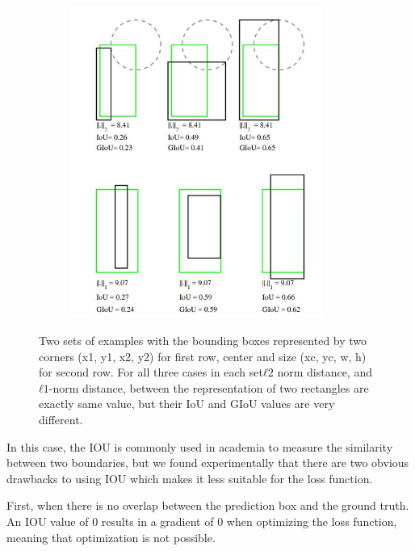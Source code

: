 \begin{figure}[h]
	\begin{center}
		\begin{subfigure}[b]{0.49\textwidth}
		    \centering
			\includegraphics[width=0.9\textwidth]{thesis-template-master/images/l2loss.JPG}
			\label{fig:cellnet}
		\end{subfigure}
	\end{center}
	\caption{Two sets of examples with the bounding
boxes represented by two corners (x1, y1, x2, y2) for first row, center and size (xc, yc, w, h) for second row. For all three cases in each set$ ℓ2$
norm distance, and  $ℓ1$-norm distance, between the representation of two rectangles are exactly same value, but their IoU and GIoU values are very different.}
\end{figure}


In this case, the IOU is commonly used in academia to measure the similarity between two boundaries, but we found experimentally that there are two obvious drawbacks to using IOU which makes it less suitable for the loss function.

First, when there is no overlap between the prediction box and the ground truth. An IOU value of 0 results in a gradient of 0 when optimizing the loss function, meaning that optimization is not possible.

